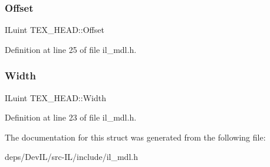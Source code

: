 \subsubsection{\texorpdfstring{Offset}{Offset}}
{\footnotesize\ttfamily I\+Luint T\+E\+X\+\_\+\+H\+E\+A\+D\+::\+Offset}



Definition at line 25 of file il\+\_\+mdl.\+h.

\mbox{\label{structTEX__HEAD_a7889271dd79caccfd8df320ebe765be2}} 
\subsubsection{\texorpdfstring{Width}{Width}}
{\footnotesize\ttfamily I\+Luint T\+E\+X\+\_\+\+H\+E\+A\+D\+::\+Width}



Definition at line 23 of file il\+\_\+mdl.\+h.



The documentation for this struct was generated from the following file\+:\begin{DoxyCompactItemize}
\item 
deps/\+Dev\+I\+L/src-\/\+I\+L/include/il\+\_\+mdl.\+h\end{DoxyCompactItemize}
